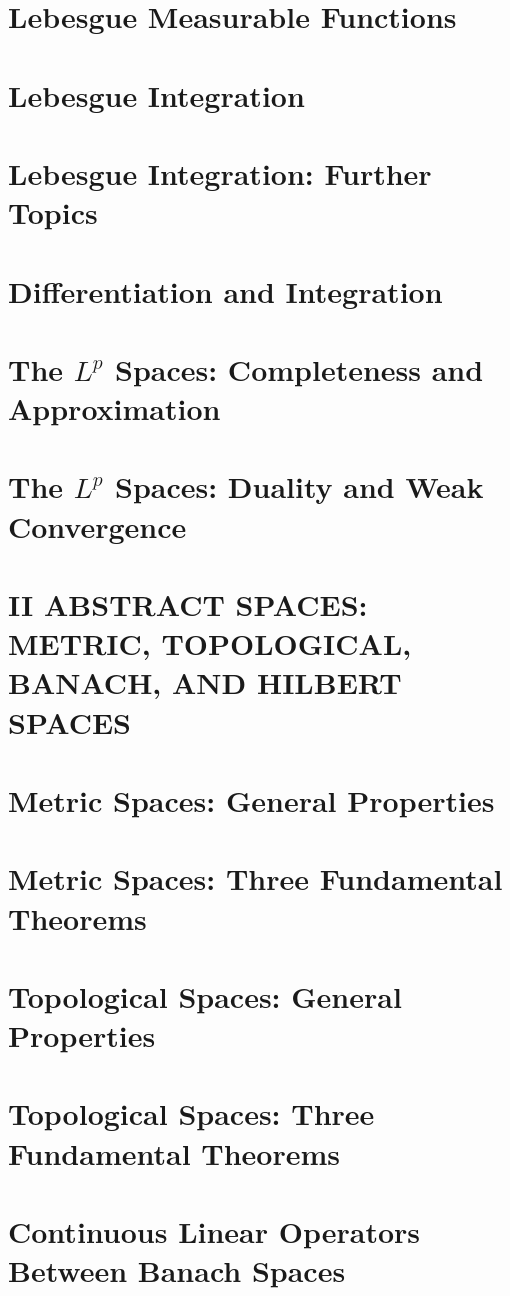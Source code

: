 \documentclass[a4paper,10pt]{book}
\theoremstyle{plain} %
\begin{document}
\chapter{Lebesgue Measurable Functions}
\chapter{Lebesgue Integration}
\chapter{Lebesgue Integration: Further Topics}
\chapter{Differentiation and Integration}
\chapter{The $L^p$ Spaces: Completeness and Approximation}
\chapter{The $L^p$ Spaces: Duality and Weak Convergence}

\setcounter{chapter}{0}
\chapter*{II ABSTRACT SPACES: METRIC, TOPOLOGICAL, BANACH, AND HILBERT SPACES}
\setcounter{chapter}{8}

\chapter{Metric Spaces: General Properties}
\chapter{Metric Spaces: Three Fundamental Theorems}
\chapter{Topological Spaces: General Properties}
\chapter{Topological Spaces: Three Fundamental Theorems}
\chapter{Continuous Linear Operators Between Banach Spaces}
\end{document}

